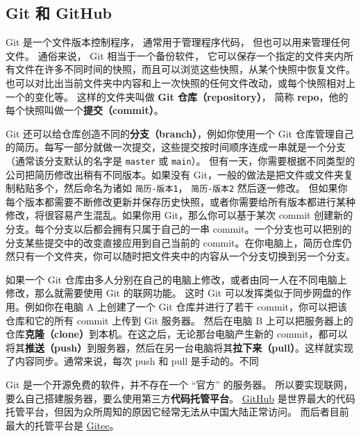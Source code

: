 

\subsection{Git 和 GitHub}
Git 是一个文件版本控制程序， 通常用于管理程序代码， 但也可以用来管理任何文件。 通俗来说， Git 相当于一个备份软件， 它可以保存一个指定的文件夹内所有文件在许多不同时间的快照，而且可以浏览这些快照，从某个快照中恢复文件。 也可以对比出当前文件夹中内容和上一次快照的任何文件改动，或每个快照相对上一个的变化等。 这样的文件夹叫做 \textbf{Git 仓库（repository）}， 简称 \textbf{repo}，他的每个快照叫做一个\textbf{提交（commit）}。


Git 还可以给仓库创造不同的\textbf{分支（branch）}，例如你使用一个 Git 仓库管理自己的简历。每写一部分就做一次提交，这些提交按时间顺序连成一串就是一个分支（通常该分支默认的名字是 \verb`master` 或 \verb`main`）。 但有一天，你需要根据不同类型的公司把简历修改出稍有不同版本。如果没有 Git，一般的做法是把文件或文件夹复制粘贴多个，然后命名为诸如 \verb`简历-版本1`， \verb`简历-版本2` 然后逐一修改。 但如果你每个版本都需要不断修改更新并保存历史快照，或者你需要给所有版本都进行某种修改，将很容易产生混乱。如果你用 Git，那么你可以基于某次 commit 创建新的分支。每个分支以后都会拥有只属于自己的一串 commit。一个分支也可以把别的分支某些提交中的改变直接应用到自己当前的 commit。在你电脑上，简历仓库仍然只有一个文件夹，你可以随时把文件夹中的内容从一个分支切换到另一个分支。

如果一个 Git 仓库由多人分别在自己的电脑上修改，或者由同一人在不同电脑上修改，那么就需要使用 Git 的联网功能。 这时 Git 可以发挥类似于同步网盘的作用。例如你在电脑 A 上创建了一个 Git 仓库并进行了若干 commit，你可以把该仓库和它的所有 commit 上传到 Git 服务器。 然后在电脑 B 上可以把服务器上的仓库\textbf{克隆（clone）}到本机。在这之后，无论那台电脑产生新的 commit，都可以将其\textbf{推送（push）}到服务器，然后在另一台电脑将其\textbf{拉下来（pull）}。这样就实现了内容同步。通常来说，每次 push 和 pull 是手动的。不同

Git 是一个开源免费的软件，并不存在一个 “官方” 的服务器。 所以要实现联网，要么自己搭建服务器，要么使用第三方\textbf{代码托管平台}。 \href{https://github.com/}{GitHub} 是世界最大的代码托管平台，但因为众所周知的原因它经常无法从中国大陆正常访问。 而后者目前最大的托管平台是 \href{https://gitee.com/}{Gitee}。

